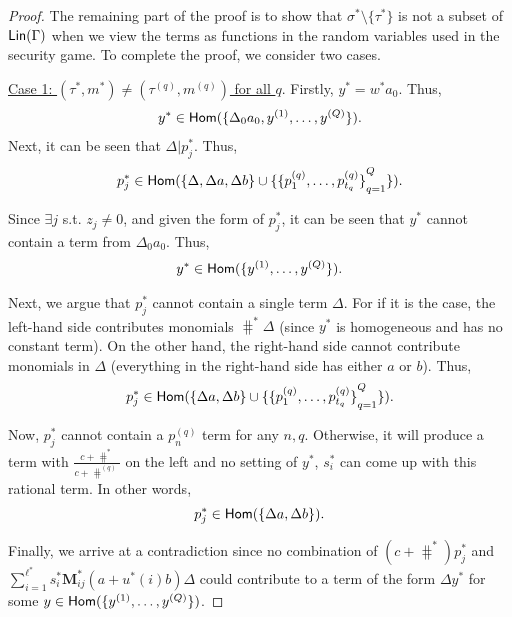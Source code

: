 \begin{proof}
The remaining part of the proof is to show that $\sigma^\ast\setminus\{\tau^\ast\}$ is not a subset of $\textsf{Lin}(\Gamma)$ when we view the terms as functions in the random variables used in the security game. To complete the proof, we consider two cases.

\noindent\underline{Case 1: $(\tau^\ast, m^\ast) \neq (\tau^{(q)}, m^{(q)})$ for all $q$}. Firstly, $y^\ast =w^\ast a_0$. Thus,
\begin{align*}
  y^\ast \in \textsf{Hom}(\{\Delta_0a_0, y^{(1)}, \dots, y^{(Q)}\}).
\end{align*}
Next, it can be seen that $\Delta | p_j^\ast$. Thus,
\begin{align*}
  p_j^\ast \in \textsf{Hom}( \{\Delta, \Delta a, \Delta b\} \cup \{ {\{p_1^{(q)}, \dots, p_{t_q}^{(q)}  \}}_{q=1}^Q\} ).
\end{align*}

Since $\exists j$ s.t. $z_j \neq 0$, and given the form of $p_j^\ast$,  it can be seen that $y^\ast$ cannot contain a term from $\Delta_0 a_0$. Thus,
\begin{align*}
  y^\ast \in \textsf{Hom}(\{y^{(1)}, \dots, y^{(Q)}\}).
\end{align*}

Next, we argue that $p_j^\ast$ cannot contain a single term $\Delta$. For if it is the case, the left-hand side contributes monomials $\hash^\ast\Delta$ (since $y^\ast$ is homogeneous and has no constant term). On the other hand, the right-hand side cannot contribute monomials in $\Delta$ (everything in the right-hand side has either $a$ or $b$). Thus,
\begin{align*}
  p_j^\ast \in \textsf{Hom}( \{\Delta a, \Delta b\} \cup \{ {\{p_1^{(q)}, \dots, p_{t_q}^{(q)}  \}}_{q=1}^Q\} ).
\end{align*}

Now, $p_j^\ast$ cannot contain a $p_n^{(q)}$ term for any $n, q$. Otherwise, it will produce a term with $\frac{c+\hash^\ast}{c+\hash^{(q)}}$ on the left and no setting of $y^\ast$, $s_i^\ast$ can come up with this rational term. In other words,
\begin{align*}
  p_j^\ast \in \textsf{Hom}( \{\Delta a, \Delta b\}).
\end{align*}

Finally, we arrive at a contradiction since no combination of $(c+\hash^\ast)p_j^\ast$ and $\sum_{i=1}^{\ell^\ast} s^\ast_i \mathbf{M}^\ast_{ij}(a+u^\ast(i)b)\Delta$ could contribute to a term of the form $\Delta y^\ast$ for some $y\in \textsf{Hom}(\{y^{(1)}, \dots, y^{(Q)}\})$.


\end{proof}
